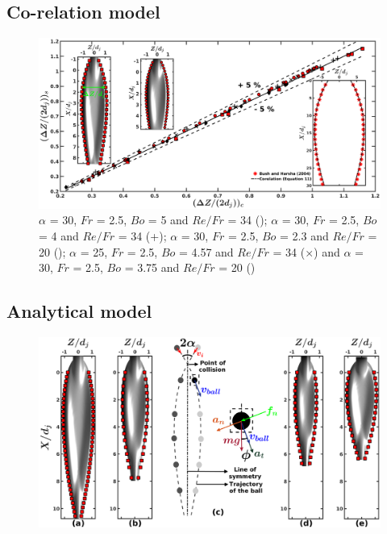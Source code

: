 \documentclass[%
aip,
sd,%
amsmath,amssymb,
preprint,%
author-year,%
]{revtex4-1}
\begin{document}
\subsection{Co-relation model}
\begin{figure}
	\centering
	\includegraphics[width=\linewidth]{corelatehx}
	\caption{$\alpha$ = 30, $Fr$ = 2.5, $Bo$ = 5 and $Re/Fr$ = 34 (\protect\MarkerSquareRed); $\alpha$ = 30, $Fr$ = 2.5, $Bo$ = 4 and $Re/Fr$ = 34 (+); $\alpha$ = 30, $Fr$ = 2.5, $Bo$ = 2.3 and $Re/Fr$ = 20 (\protect \MarkerDiamondBlack); $\alpha$ = 25, $Fr$ = 2.5, $Bo$ = 4.57 and $Re/Fr$ = 34 ($\times$) and $\alpha$ = 30, $Fr$ = 2.5, $Bo$ = 3.75 and $Re/Fr$ = 20 (\protect \MarkerCircleRed) }
	\label{Figure::corelatehx}
\end{figure}
\cleardoublepage
\subsection{Analytical model}
\begin{figure}
	\centering
	\includegraphics[width=\linewidth]{analytical}
	\caption{}
	\label{Figure::analytical}
\end{figure}
\cleardoublepage
\end{document}
